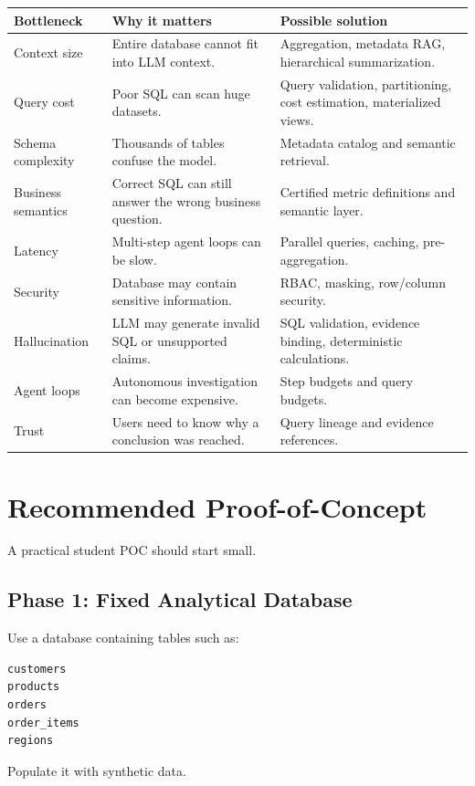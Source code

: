 \documentclass[11pt,a4paper]{article}
\begin{document}
\begin{longtable}{p{} p{} p{}}
\toprule
\textbf{Bottleneck} & \textbf{Why it matters} & \textbf{Possible solution}\\
\midrule
Context size & Entire database cannot fit into LLM context. & Aggregation, metadata RAG, hierarchical summarization.\\
Query cost & Poor SQL can scan huge datasets. & Query validation, partitioning, cost estimation, materialized views.\\
Schema complexity & Thousands of tables confuse the model. & Metadata catalog and semantic retrieval.\\
Business semantics & Correct SQL can still answer the wrong business question. & Certified metric definitions and semantic layer.\\
Latency & Multi-step agent loops can be slow. & Parallel queries, caching, pre-aggregation.\\
Security & Database may contain sensitive information. & RBAC, masking, row/column security.\\
Hallucination & LLM may generate invalid SQL or unsupported claims. & SQL validation, evidence binding, deterministic calculations.\\
Agent loops & Autonomous investigation can become expensive. & Step budgets and query budgets.\\
Trust & Users need to know why a conclusion was reached. & Query lineage and evidence references.\\
\bottomrule
\end{longtable}

\section{Recommended Proof-of-Concept}

A practical student POC should start small.

\subsection{Phase 1: Fixed Analytical Database}

Use a database containing tables such as:

\begin{lstlisting}
customers
products
orders
order_items
regions
\end{lstlisting}

Populate it with synthetic data.
\end{document}
